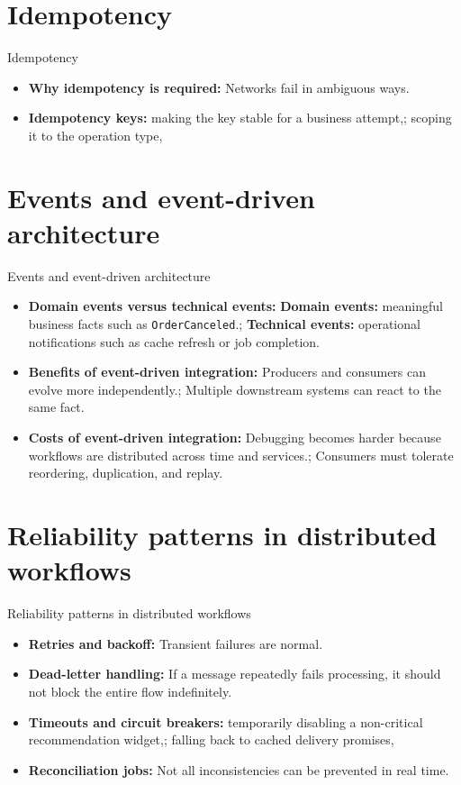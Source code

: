 \documentclass[aspectratio=169]{beamer}
\begin{document}
\section{Idempotency}

\begin{frame}{Idempotency}
  \begin{itemize}
    \item \textbf{Why idempotency is required:} Networks fail in ambiguous ways.
    \item \textbf{Idempotency keys:} making the key stable for a business attempt,; scoping it to the operation type,
  \end{itemize}
\end{frame}

\section{Events and event-driven architecture}

\begin{frame}{Events and event-driven architecture}
  \begin{itemize}
    \item \textbf{Domain events versus technical events:} \textbf{Domain events:} meaningful business facts such as \texttt{OrderCanceled}.; \textbf{Technical events:} operational notifications such as cache refresh or job completion.
    \item \textbf{Benefits of event-driven integration:} Producers and consumers can evolve more independently.; Multiple downstream systems can react to the same fact.
    \item \textbf{Costs of event-driven integration:} Debugging becomes harder because workflows are distributed across time and services.; Consumers must tolerate reordering, duplication, and replay.
  \end{itemize}
\end{frame}

\section{Reliability patterns in distributed workflows}

\begin{frame}{Reliability patterns in distributed workflows}
  \begin{itemize}
    \item \textbf{Retries and backoff:} Transient failures are normal.
    \item \textbf{Dead-letter handling:} If a message repeatedly fails processing, it should not block the entire flow indefinitely.
    \item \textbf{Timeouts and circuit breakers:} temporarily disabling a non-critical recommendation widget,; falling back to cached delivery promises,
    \item \textbf{Reconciliation jobs:} Not all inconsistencies can be prevented in real time.
  \end{itemize}
\end{frame}
\end{document}
